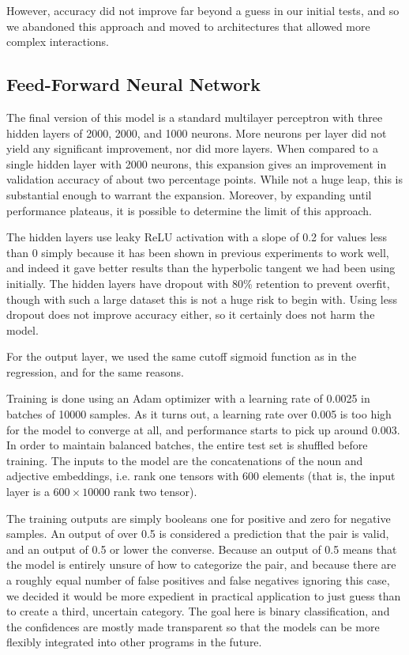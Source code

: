 \documentclass[a4paper, 12pt]{article}
\begin{document}
However, accuracy did not improve far beyond a guess in our initial tests, and so we abandoned this approach and moved to architectures that allowed more complex interactions.

\subsection{Feed-Forward Neural Network}
The final version of this model is a standard multilayer perceptron with three hidden layers of 2000, 2000, and 1000 neurons. More neurons per layer did not yield any significant improvement, nor did more layers. When compared to a single hidden layer with 2000 neurons, this expansion gives an improvement in validation accuracy of about two percentage points. While not a huge leap, this is substantial enough to warrant the expansion. Moreover, by expanding until performance plateaus, it is possible to determine the limit of this approach.

The hidden layers use leaky ReLU activation with a slope of 0.2 for values less than 0 simply because it has been shown in previous experiments to work well, and indeed it gave better results than the hyperbolic tangent we had been using initially. The hidden layers have dropout with 80\% retention to prevent overfit, though with such a large dataset this is not a huge risk to begin with. Using less dropout does not improve accuracy either, so it certainly does not harm the model.

For the output layer, we used the same cutoff sigmoid function as in the regression, and for the same reasons.

Training is done using an Adam optimizer with a learning rate of 0.0025 in batches of 10000 samples. As it turns out, a learning rate over 0.005 is too high for the model to converge at all, and performance starts to pick up around 0.003. In order to maintain balanced batches, the entire test set is shuffled before training. The inputs to the model are the concatenations of the noun and adjective embeddings, i.e. rank one tensors with 600 elements (that is, the input layer is a $ 600 \times 10000 $ rank two tensor).

The training outputs are simply booleans \textemdash one for positive and zero for negative samples. An output of over 0.5 is considered a prediction that the pair is valid, and an output of 0.5 or lower the converse. Because an output of 0.5 means that the model is entirely unsure of how to categorize the pair, and because there are a roughly equal number of false positives and false negatives ignoring this case, we decided it would be more expedient in practical application to just guess than to create a third, uncertain category. The goal here is binary classification, and the confidences are mostly made transparent so that the models can be more flexibly integrated into other programs in the future.
\end{document}
